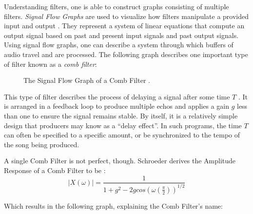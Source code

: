 Understanding filters, one is able to construct graphs consisting of multiple filters. \textit{Signal Flow Graphs} are used to visualize how filters manipulate a provided input and output \cite{FILTERS07}. They represent a system of linear equations that compute an output signal based on past and present input signals and past output signals. Using signal flow graphs, one can describe a system through which buffers of audio travel and are processed. The following graph describes one important type of filter known as a \textit{comb filter}:

\begin{figure}[h] %
	\begin{center}
		\caption{The Signal Flow Graph of a Comb Filter \cite{schroeder1961colorless}.}
	\end{center}
\end{figure}

This type of filter describes the process of delaying a signal after some time $T$ \cite{schroeder1961colorless}. It is arranged in a feedback loop to produce multiple echos and applies a gain $g$ less than one to ensure the signal remains stable. By itself, it is a relatively simple design that producers may know as a ``delay effect''. In such programs, the time $T$ can often be specified to a specific amount, or be synchronized to the tempo of the song being produced.

A single Comb Filter is not perfect, though. Schroeder derives the Amplitude Response of a Comb Filter to be \cite{schroeder1961natural}:
\begin{equation}\label{comb}
	|X(\omega)|=\frac{1}{1+g^2-2g cos(\omega(\frac{\pi}{2}))^{1/2}}
\end{equation}

Which results in the following graph, explaining the Comb Filter's name:
\pagebreak

